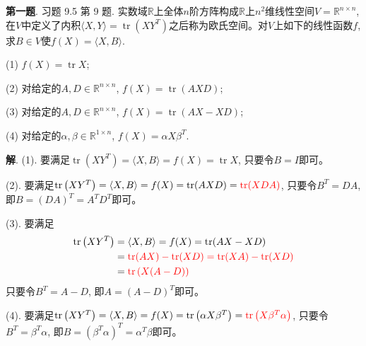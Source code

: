 \usepackage{relsize}

\renewcommand{\newpageorvspace}{\newpage}

\date{2022-6-17  第七次习题课}




\maketitle


\larger[2]


{\bf 第一题}. 习题 9.5 第 9 题. 实数域$\mathbb{R}$上全体$n$阶方阵构成$\mathbb{R}$上$n^2$维线性空间$V = \mathbb{R}^{n\times n}$, 在$V$中定义了内积$\langle X, Y \rangle = \operatorname{tr} \left( XY^T \right)$之后称为欧氏空间。对$V$上如下的线性函数$f$, 求$B\in V$使$f(X) = \langle X, B \rangle.$

(1) $f(X) = \operatorname{tr} X$;

(2) 对给定的$A, D \in \mathbb{R}^{n\times n}$, $f(X) = \operatorname{tr}(AXD)$;

(3) 对给定的$A, D \in \mathbb{R}^{n\times n}$, $f(X) = \operatorname{tr}(AX - XD)$;

(4) 对给定的$\alpha, \beta \in \mathbb{R}^{1\times n}$, $f(X) = \alpha X \beta^T$.

\newpageorvspace

{\bf 解}. (1). 要满足$\operatorname{tr} \left( XY^T \right) = \langle X, B \rangle = f(X) = \operatorname{tr} X$, 只要令$B = I$即可。

(2). 要满足$\operatorname{tr} \left( XY^T \right) = \langle X, B \rangle = f(X) = \operatorname{tr} (AXD) = {\color{red} \operatorname{tr} (XDA)}$, 只要令$B^T = DA$, 即$B = (DA)^T = A^T D^T$即可。

(3). 要满足
\begin{align*}
\operatorname{tr} \left( XY^T \right) & = \langle X, B \rangle = f(X) = \operatorname{tr} (AX - XD) \\
& = {\color{red} \operatorname{tr} (AX) - \operatorname{tr} (XD) = \operatorname{tr} (XA) - \operatorname{tr} (XD)} \\
& = {\color{red} \operatorname{tr} \left( X(A-D) \right)}
\end{align*}
只要令$B^T = A-D$, 即$A = (A-D)^T$即可。

(4). 要满足$\operatorname{tr} \left( XY^T \right) = \langle X, B \rangle = f(X) = \operatorname{tr} \left( \alpha X \beta^T \right) = {\color{red} \operatorname{tr} \left( X \beta^T \alpha \right)}$, 只要令$B^T = \beta^T \alpha$, 即$B = (\beta^T \alpha)^T = \alpha^T \beta$即可。

